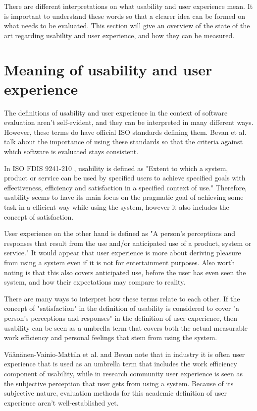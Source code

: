 There are different interpretations on what usability and user experience mean. It is important to understand these words so that a clearer idea can be formed on what needs to be evaluated. This section will give an overview of the state of the art regarding usability and user experience, and how they can be measured.

\section{Meaning of usability and user experience} \label{definitions_section}
The definitions of usability and user experience in the context of software evaluation aren't self-evident, and they can be interpreted in many different ways. However, these terms do have official ISO standards defining them. Bevan et al. \cite{bevanstandard} talk about the importance of using these standards so that the criteria against which software is evaluated stays consistent.

In  ISO FDIS 9241-210 \cite{dis20099241}, usability is defined as "Extent to which  a system, product or service can be used by specified users to achieve specified goals with effectiveness, efficiency and satisfaction in a specified context of use." Therefore, usability seems to have its main focus on the pragmatic goal of achieving some task in a efficient way while using the system, however it also includes the concept of satisfaction.

User experience on the other hand is defined as "A person's perceptions and responses that result from the use and/or anticipated use of a product, system or service." It would appear that user experience is more about deriving pleasure from using a system even if it is not for entertainment purposes. Also worth noting is that this also covers anticipated use, before the user has even seen the system, and how their expectations may compare to reality.

There are many ways to interpret how these terms relate to each other. If the concept of "satisfaction" in the definition of usability is considered to cover "a person's perceptions and responses" in the definition of user experience, then usability can be seen as a umbrella term that covers both the actual measurable work efficiency and personal feelings that stem from using the system.

Väänänen-Vainio-Mattila et al. \cite{vaananen2008towards} and Bevan \cite{bevan2009difference} note that in industry it is often user experience that is used as an umbrella term that includes the work efficiency component of usability, while in research community user experience is seen as the subjective perception that user gets from using a system. Because of its subjective nature, evaluation methods for this academic definition of user experience aren't well-established yet.

